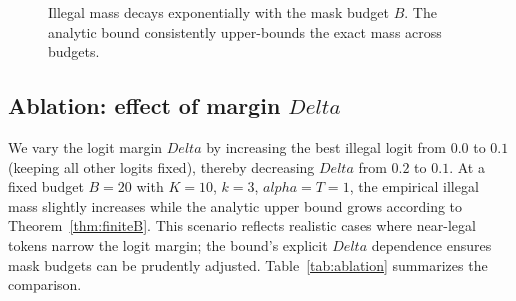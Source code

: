 \documentclass{article}
\def\alpha{alpha}%
\def\Delta{Delta}%
\begin{document}
\begin{figure}[h]
\centering
\vspace{0.5em}
\caption[Illegal mass versus mask budget]{Illegal mass decays exponentially with the mask budget $B$. The analytic bound consistently upper-bounds the exact mass across budgets.}
\label{fig:leakage_plot}
\vspace{0.5em}
\end{figure}

\subsection{Ablation: effect of margin $\Delta$}\label{sec:ablation}
We vary the logit margin $\Delta$ by increasing the best illegal logit from $0.0$ to $0.1$ (keeping all other logits fixed), thereby decreasing $\Delta$ from $0.2$ to $0.1$. At a fixed budget $B=20$ with $K=10$, $k=3$, $\alpha=T=1$, the empirical illegal mass slightly increases while the analytic upper bound grows according to Theorem~\ref{thm:finiteB}. This scenario reflects realistic cases where near-legal tokens narrow the logit margin; the bound’s explicit $\Delta$ dependence ensures mask budgets can be prudently adjusted. Table~\ref{tab:ablation} summarizes the comparison.
\end{document}
